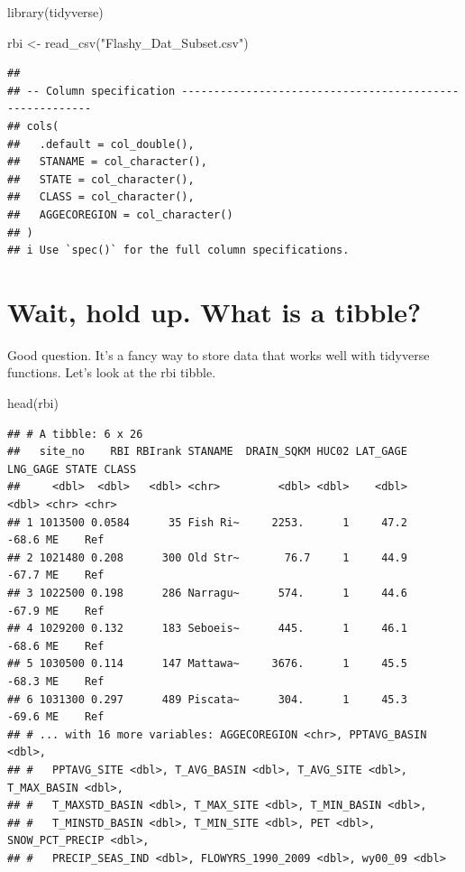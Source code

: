 \documentclass[
]{book}
\newenvironment{Shaded}{\begin{snugshade}}{\end{snugshade}}
\newcommand{\FunctionTok}[1]{\textcolor[rgb]{0.00,0.00,0.00}{#1}}
\newcommand{\NormalTok}[1]{#1}
\newcommand{\OtherTok}[1]{\textcolor[rgb]{0.56,0.35,0.01}{#1}}
\newcommand{\StringTok}[1]{\textcolor[rgb]{0.31,0.60,0.02}{#1}}
\begin{document}
\begin{Shaded}
\begin{Highlighting}[]
\FunctionTok{library}\NormalTok{(tidyverse)}

\NormalTok{rbi }\OtherTok{\textless{}{-}} \FunctionTok{read\_csv}\NormalTok{(}\StringTok{"Flashy\_Dat\_Subset.csv"}\NormalTok{)}
\end{Highlighting}
\end{Shaded}

\begin{verbatim}
## 
## -- Column specification --------------------------------------------------------
## cols(
##   .default = col_double(),
##   STANAME = col_character(),
##   STATE = col_character(),
##   CLASS = col_character(),
##   AGGECOREGION = col_character()
## )
## i Use `spec()` for the full column specifications.
\end{verbatim}

\hypertarget{wait-hold-up.-what-is-a-tibble}{%
\section{Wait, hold up. What is a tibble?}\label{wait-hold-up.-what-is-a-tibble}}

Good question. It's a fancy way to store data that works well with tidyverse functions. Let's look at the rbi tibble.

\begin{Shaded}
\begin{Highlighting}[]
\FunctionTok{head}\NormalTok{(rbi)}
\end{Highlighting}
\end{Shaded}

\begin{verbatim}
## # A tibble: 6 x 26
##   site_no    RBI RBIrank STANAME  DRAIN_SQKM HUC02 LAT_GAGE LNG_GAGE STATE CLASS
##     <dbl>  <dbl>   <dbl> <chr>         <dbl> <dbl>    <dbl>    <dbl> <chr> <chr>
## 1 1013500 0.0584      35 Fish Ri~     2253.      1     47.2    -68.6 ME    Ref  
## 2 1021480 0.208      300 Old Str~       76.7     1     44.9    -67.7 ME    Ref  
## 3 1022500 0.198      286 Narragu~      574.      1     44.6    -67.9 ME    Ref  
## 4 1029200 0.132      183 Seboeis~      445.      1     46.1    -68.6 ME    Ref  
## 5 1030500 0.114      147 Mattawa~     3676.      1     45.5    -68.3 ME    Ref  
## 6 1031300 0.297      489 Piscata~      304.      1     45.3    -69.6 ME    Ref  
## # ... with 16 more variables: AGGECOREGION <chr>, PPTAVG_BASIN <dbl>,
## #   PPTAVG_SITE <dbl>, T_AVG_BASIN <dbl>, T_AVG_SITE <dbl>, T_MAX_BASIN <dbl>,
## #   T_MAXSTD_BASIN <dbl>, T_MAX_SITE <dbl>, T_MIN_BASIN <dbl>,
## #   T_MINSTD_BASIN <dbl>, T_MIN_SITE <dbl>, PET <dbl>, SNOW_PCT_PRECIP <dbl>,
## #   PRECIP_SEAS_IND <dbl>, FLOWYRS_1990_2009 <dbl>, wy00_09 <dbl>
\end{verbatim}
\end{document}
